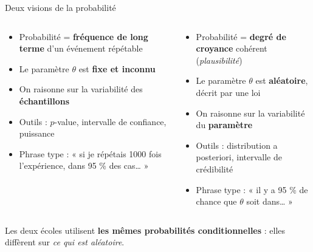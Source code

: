 \begin{frame}{Deux visions de la probabilité}
\begin{columns}[t]
\begin{column}{0.48\textwidth}
\begin{tcolorbox}[enhanced,colback=byRed!7,colframe=byRed,arc=2mm,
   title={\bfseries\color{white} Fréquentiste},colbacktitle=byRed,
   attach boxed title to top left={xshift=3mm,yshift=-2mm},
   boxed title style={arc=1mm,boxrule=0pt}]
\begin{itemize}
  \item Probabilité = \textbf{fréquence de long terme} d'un événement répétable
  \item Le paramètre $\theta$ est \textbf{fixe et inconnu}
  \item On raisonne sur la variabilité des \textbf{échantillons}
  \item Outils : $p$-value, intervalle de confiance, puissance
  \item Phrase type : « si je répétais 1000 fois l'expérience, dans 95 \% des cas… »
\end{itemize}
\end{tcolorbox}
\end{column}
\begin{column}{0.48\textwidth}
\begin{tcolorbox}[enhanced,colback=byBlue!7,colframe=byBlue,arc=2mm,
   title={\bfseries\color{white} Bayésien},colbacktitle=byBlue,
   attach boxed title to top left={xshift=3mm,yshift=-2mm},
   boxed title style={arc=1mm,boxrule=0pt}]
\begin{itemize}
  \item Probabilité = \textbf{degré de croyance} cohérent (\textit{plausibilité})
  \item Le paramètre $\theta$ est \textbf{aléatoire}, décrit par une loi
  \item On raisonne sur la variabilité du \textbf{paramètre}
  \item Outils : distribution a posteriori, intervalle de crédibilité
  \item Phrase type : « il y a 95 \% de chance que $\theta$ soit dans… »
\end{itemize}
\end{tcolorbox}
\end{column}
\end{columns}
\vspace{1.5mm}
\centering\small
Les deux écoles utilisent \textbf{les mêmes probabilités conditionnelles} :
elles diffèrent sur \textit{ce qui est aléatoire}.
\end{frame}

